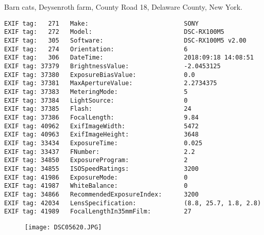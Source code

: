 \section{\protect{}}
\noindent Barn cats, Deysenroth farm, County Road 18, Delaware County, New York.
\noindent
\begin{lstlisting}
EXIF tag:   271   Make:                          SONY
EXIF tag:   272   Model:                         DSC-RX100M5
EXIF tag:   305   Software:                      DSC-RX100M5 v2.00
EXIF tag:   274   Orientation:                   6
EXIF tag:   306   DateTime:                      2018:09:18 14:08:51
EXIF tag: 37379   BrightnessValue:               -2.0453125
EXIF tag: 37380   ExposureBiasValue:             0.0
EXIF tag: 37381   MaxApertureValue:              2.2734375
EXIF tag: 37383   MeteringMode:                  5
EXIF tag: 37384   LightSource:                   0
EXIF tag: 37385   Flash:                         24
EXIF tag: 37386   FocalLength:                   9.84
EXIF tag: 40962   ExifImageWidth:                5472
EXIF tag: 40963   ExifImageHeight:               3648
EXIF tag: 33434   ExposureTime:                  0.025
EXIF tag: 33437   FNumber:                       2.2
EXIF tag: 34850   ExposureProgram:               2
EXIF tag: 34855   ISOSpeedRatings:               3200
EXIF tag: 41986   ExposureMode:                  0
EXIF tag: 41987   WhiteBalance:                  0
EXIF tag: 34866   RecommendedExposureIndex:      3200
EXIF tag: 42034   LensSpecification:             (8.8, 25.7, 1.8, 2.8)
EXIF tag: 41989   FocalLengthIn35mmFilm:         27

\end{lstlisting}
\clearpage
\begin{figure}
\raggedleft
\texttt{[image: DSC05620.JPG]}
\end{figure}


\clearpage
